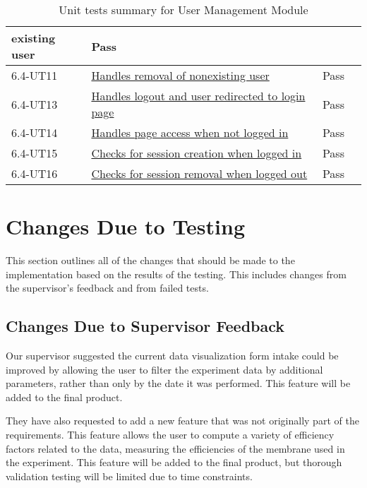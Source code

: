 \documentclass[12pt, titlepage]{article}
\begin{document}
\begin{table}[H]
\begin{tabular}{|l|l|l|l|}
{    existing user} & Pass\\
    \hline
    6.4-UT11 &
    \href{https://github.com/SumanyaG/Alkalytics/blob/main/src/backend/test/userServiceTest.py}{Handles
    removal of nonexisting user} & Pass\\
    \hline
    6.4-UT13 &
    \href{https://github.com/SumanyaG/Alkalytics/blob/main/src/frontend/test/components/auth/AccountMenu.test.tsx}{Handles
    logout and user redirected to login page} & Pass\\
    \hline
    6.4-UT14 &
    \href{https://github.com/SumanyaG/Alkalytics/blob/main/src/frontend/test/components/auth/ProtectedRoute.test.tsx}{Handles
    page access when not logged in} & Pass\\
    \hline
    6.4-UT15 &
    \href{https://github.com/SumanyaG/Alkalytics/blob/main/src/frontend/test/context/authContext.test.tsx}{Checks
    for session creation when logged in} & Pass\\
    \hline
    6.4-UT16 &
    \href{https://github.com/SumanyaG/Alkalytics/blob/main/src/frontend/test/context/authContext.test.tsx}{Checks
    for session removal when logged out} & Pass\\
    \hline
  \end{tabular}
  \caption{Unit tests summary for User Management Module}
  \label{UT:UM}
\end{table}

\section{Changes Due to Testing}
This section outlines all of the changes that should be made to the
implementation based on the results of the testing. This includes changes from
the supervisor's feedback and from failed tests.

\subsection{Changes Due to Supervisor Feedback}

Our supervisor suggested the current data visualization form intake could be
improved by allowing the user to filter the experiment data by additional
parameters, rather than only by the date it was performed. This feature will be
added to the final product.

They have also requested to add a new feature that was not originally part of
the requirements. This feature allows the user to compute a variety of
efficiency factors related to the data, measuring the efficiencies of the
membrane used in the experiment. This feature will be added to the final
product, but thorough validation testing will be limited due to time
constraints.
\end{document}
